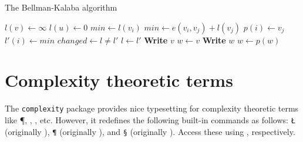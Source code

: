 \documentclass[11pt, a4paper]{article}
\begin{document}
\begin{algorithm}
	\caption{The Bellman-Kalaba algorithm}
	\label{alg:ex1} %


	\begin{algorithmic}[1]
			\EndRepeatTimes  {}
	
				\State $l(v) \leftarrow \infty$
			\EndFor
			\State $l(u) \leftarrow 0$
			\Repeat
					\State $min \leftarrow l(v_i)$
							\State $min \leftarrow e(v_i, v_j) + l(v_j)$
							\State $p(i) \leftarrow v_j$
						\EndIf
					\EndFor
					\State $l'(i) \leftarrow min$
				\EndFor
				\State $changed \leftarrow l \not= l'$
				\State $l \leftarrow l'$
		\EndProcedure
		\Statex
		\Statex {}
		\Statex
				\State \textbf{Write} $v$
			\Else
				\State $w \leftarrow v$
					\State \textbf{Write} $w$
					\State $w \leftarrow p(w)$
				\EndWhile
			\EndIf
		\EndProcedure
	\end{algorithmic}
\end{algorithm}


\section{Complexity theoretic terms}
The \texttt{complexity} package provides nice typesetting for complexity theoretic terms like \P, \NP, \EXPSPACE, etc. However, it redefines the following built-in commands as follows: \texttt{\L} (originally ), \texttt{\P} (originally ), and \texttt{\S} (originally ). Access these using \texttt{\string{}}, respectively.
\end{document}
